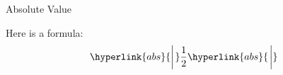 \documentclass{article}
\newcommand{\mAbs}[1]{%
  \mathopen{\hyperlink{abs}{\left\lvert\vphantom{#1}\right.}}%
  #1%
  \mathclose{\hyperlink{abs}{\left.\vphantom{#1}\right\rvert}}%
}
\begin{document}
\hypertarget{abs}{Absolute Value}
Here is a formula:
\[ \mAbs{\frac{1}{2}} \]
\end{document}
